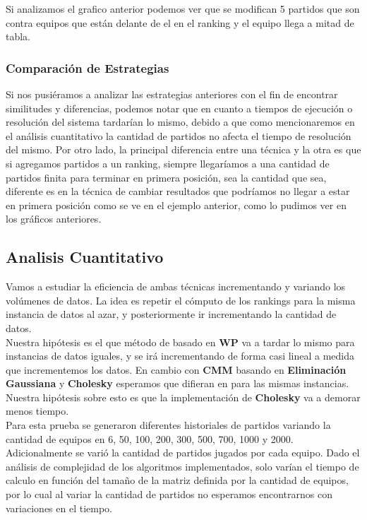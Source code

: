 Si analizamos el grafico anterior podemos ver que se modifican 5 partidos que son contra equipos que están delante de el en el ranking y el equipo llega a mitad de tabla.
\subsubsection{Comparación de Estrategias}
Si nos pusiéramos a analizar las estrategias anteriores con el fin de encontrar similitudes y diferencias, podemos notar que en cuanto a tiempos de ejecución o resolución del sistema tardarían lo mismo, debido a que como mencionaremos en el análisis cuantitativo la cantidad de partidos no afecta el tiempo de resolución del mismo.
Por otro lado, la principal diferencia entre una técnica y la otra es que si agregamos partidos a un ranking, siempre llegaríamos a una cantidad de partidos finita para terminar en primera posición, sea la cantidad que sea, diferente es en la técnica de cambiar resultados que podríamos no llegar a estar en primera posición como se ve en el ejemplo anterior, como lo pudimos ver en los gráficos anteriores.

\subsection{Analisis Cuantitativo}


Vamos a estudiar la eficiencia de ambas técnicas incrementando y variando los volúmenes de datos. La idea es repetir el cómputo de los rankings para la misma instancia de datos al azar, 
y posteriormente ir incrementando la cantidad de datos. \\

Nuestra hipótesis es el que método de basado en \textbf{WP} va a tardar lo mismo para instancias de datos iguales, y se irá incrementando de forma casi lineal a medida que 
incrementemos los datos. En cambio con \textbf{CMM} basando en \textbf{Eliminación Gaussiana} y \textbf{Cholesky} esperamos que difieran en para las mismas instancias. 
Nuestra hipótesis sobre esto es que la implementación de \textbf{Cholesky} va a demorar menos tiempo. \\

Para esta prueba se generaron diferentes historiales de partidos variando la cantidad de equipos en 6, 50, 100, 200, 300, 500, 700, 1000 y 2000. \\

Adicionalmente se varió la cantidad de partidos jugados por cada equipo. Dado el análisis de complejidad de los algoritmos implementados, solo varían el tiempo de calculo en 
función del tamaño de la matriz definida por la cantidad de equipos, por lo cual al variar la cantidad de partidos no esperamos encontrarnos con variaciones en el tiempo. \\

